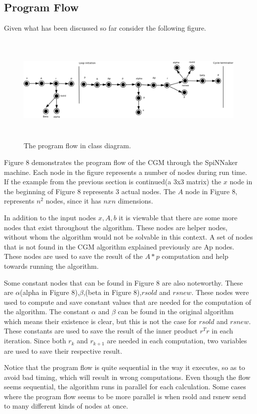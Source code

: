 \documentclass[12pt,a4paper]{article}
\begin{document}
\subsection{Program Flow}
Given what has been discussed so far consider the following figure.
\begin{figure}[h!]
\includegraphics[width=500pt,height=150pt,scale=1]{Pics/program_flow.png}
\centering
\caption{The program flow in class diagram.}
\end{figure}
Figure 8 demonstrates the program flow of the CGM through the SpiNNaker machine. Each node in the figure represents a number of nodes during run time. If the example from the previous section is continued(a 3x3 matrix) the $x$ node in the beginning of Figure 8 represents 3 actual nodes. The $A$ node in Figure 8, represents $n^2$ nodes, since it has $nxn$ dimensions.

In addition to the input nodes $x,A,b$ it is viewable that there are some more nodes that exist throughout the algorithm. These nodes are helper nodes, without whom the algorithm would not be solvable in this context. A set of nodes that is not found in the CGM algorithm explained previously are Ap nodes. These nodes are used to save the result of the $A*p$ computation and help towards running the algorithm.

Some constant nodes that can be found in Figure 8 are also noteworthy. These are $\alpha$(alpha in Figure 8),$\beta$,(beta in Figure 8),$rsold$ and $rsnew$. These nodes were used to compute and save constant values that are needed for the computation of the algorithm. The constant $\alpha$ and $\beta$ can be found in the original algorithm which means their existence is clear, but this is not the case for $rsold$ and $rsnew$. These constants are used to save the result of the inner product $r^Tr$ in each iteration. Since both $r_k$ and $r_{k+1}$ are needed in each computation, two variables are used to save their respective result.

Notice that the program flow is quite sequential in the way it executes, so as to avoid bad timing, which will result in wrong computations. Even though the flow seems sequential, the algorithm runs in parallel for each calculation. Some cases where the program flow seems to be more parallel is when rsold and rsnew send to many different kinds of nodes at once.
\end{document}
